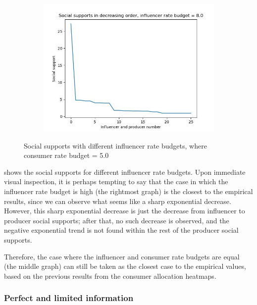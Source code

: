 \documentclass[11pt, letterpaper]{article}
\begin{document}
\begin{figure}[h]
\begin{adjustbox}{max width=1.5\textwidth,center}
\begin{subfigure}[b]{0.45\textwidth}
        \includegraphics[width=\linewidth]{"figures/M_INFL/8.0_supps.jpg"}
    \end{subfigure}
\end{adjustbox}
\caption{Social supports with different influencer rate budgets, where consumer rate budget = 5.0}
\label{fig:M_INFL_supps}
\end{figure}

 shows the social supports for different influencer rate budgets. Upon immediate visual inspection, it is perhaps tempting to say that the case in which the influencer rate budget is high (the rightmost graph) is the closest to the empirical results, since we can observe what seems like a sharp exponential decrease. However, this sharp exponential decrease is just the decrease from influencer to producer social supports; after that, no such decrease is observed, and the negative exponential trend is not found within the rest of the producer social supports.

Therefore, the case where the influencer and consumer rate budgets are equal (the middle graph) can still be taken as the closest case to the empirical values, based on the previous results from the consumer allocation heatmaps.

\subsubsection{Perfect and limited information}
\end{document}
